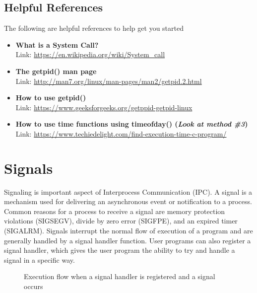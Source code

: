 \documentclass{article}
\begin{document}
\subsection*{Helpful References}
The following are helpful references to help get you started
\begin{itemize}
\item \textbf{What is a System Call?} \\
Link:  \href{https://en.wikipedia.org/wiki/System_call}{https://en.wikipedia.org/wiki/System\_call}
\item \textbf{The getpid() man page} \\
Link:  \href{http://man7.org/linux/man-pages/man2/getpid.2.html}{http://man7.org/linux/man-pages/man2/getpid.2.html}
\item \textbf{How to use getpid()}\\
Link:  \href{https://www.geeksforgeeks.org/getppid-getpid-linux}{https://www.geeksforgeeks.org/getppid-getpid-linux}
\item \textbf{How to use time functions using timeofday() (\textit{Look at method \#3})}\\
Link: \href{https://www.techiedelight.com/find-execution-time-c-program/}{https://www.techiedelight.com/find-execution-time-c-program/}
\end{itemize}


\section{Signals}
Signaling is important aspect of Interprocess Communication (IPC). A signal is a mechanism used for delivering an asynchronous event or notification to a process. Common reasons for a process to receive a signal are memory protection violations (SIGSEGV), divide by zero error (SIGFPE), and an expired timer (SIGALRM). Signals interrupt the normal flow of execution of a program and are generally handled by a signal handler function. User programs can also register a signal handler, which gives the user program the ability to try and handle a signal in a specific way.

 \begin{figure}[!htb]
        \captionsetup{justification=centering}
        \caption{Execution flow when a signal handler is registered and a signal occurs}
\end{figure}
\end{document}
